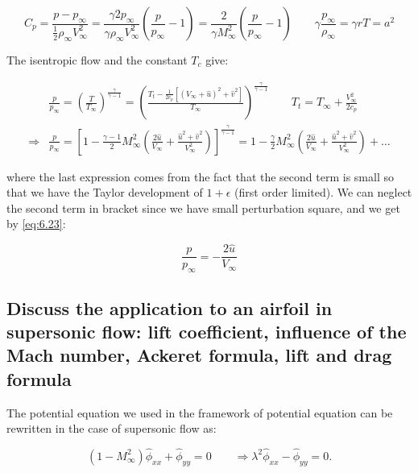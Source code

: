 \documentclass[british,french,11pt, a4paper, openany]{article}
\begin{document}
\begin{equation}
C_p = \frac{p-p_\infty}{\frac{1}{2}\rho _\infty V_\infty^2} = \frac{\gamma 2p_\infty}{\gamma \rho _\infty V_\infty ^2}\left(\frac{p}{p_\infty}-1 \right) =  \frac{2}{\gamma M^2_\infty} \left(\frac{p}{p_\infty} -1 \right) \qquad \gamma \frac{p_\infty}{\rho _\infty} = \gamma rT = a^2
\label{eq:6.23}
\end{equation}

The isentropic flow and the constant $T_c$ give: 

\begin{equation}
\begin{aligned}
&\frac{p}{p_\infty}  =\left( \frac{T}{T_\infty} \right) ^{\frac{\gamma}{\gamma - 1}} = \left( \frac{T_t - \frac{1}{2c_p}\left[ (V_\infty +\hat{u})^2 +\hat{v}^2 \right]}{T_\infty} \right)^{\frac{\gamma}{\gamma-1}} \qquad T_t = T_\infty + \frac{V_\infty^2}{2c_p}\\
\Rightarrow &\frac{p}{p_\infty}  =\left[ 1- \frac{\gamma -1}{2}M^2_\infty \left( \frac{2\hat{u}}{V_\infty} +\frac{\hat{u}^2 +\hat{v}^2}{V^2_\infty} \right) \right]^{\frac{\gamma}{\gamma-1}} = 1- \frac{\gamma}{2}M^2_\infty \left( \frac{2\hat{u}}{V_\infty} +\frac{\hat{u}^2 +\hat{v}^2}{V^2_\infty} \right)+\dots
\end{aligned}
\end{equation}

where the last expression comes from the fact that the second term is small so that we have the Taylor development of $1+\epsilon$ (first order limited). We can neglect the second term in bracket since we have small perturbation square, and we get by \eqref{eq:6.23}:

\begin{equation}
\frac{p}{p_\infty} = -\frac{2\hat{u}}{V_\infty}
\end{equation}

\subsection{Discuss the application to an airfoil in supersonic flow: lift coefficient, influence of the Mach number, Ackeret formula, lift and drag formula}
\label{Ackeret}

The potential equation we used in the framework of potential equation can be rewritten in the case of supersonic flow as:

\begin{equation}
(1-M_\infty^2) \hat{\phi}_{xx} + \hat{\phi}_{yy} = 0 \qquad \Rightarrow \lambda ^2 \hat{\phi} _{xx} - \hat{\phi} _{yy} = 0.
\end{equation}
\end{document}
